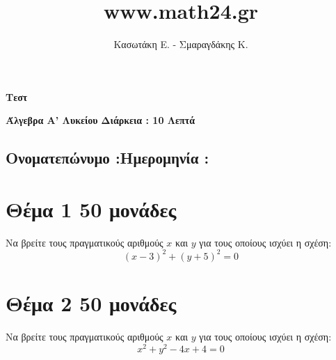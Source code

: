 \documentclass[a4paper,11pt]{report}
\author{Κασωτάκη Ε. - Σμαραγδάκης Κ.}
\title{www.math24.gr}
\begin{document}
\pagestyle{fancy}
\fancyhead{}
\fancyfoot{}
\renewcommand{\headrulewidth}{0pt}
\renewcommand{\footrulewidth}{0pt}


 
\begin{shaded}
\begin{center}
\huge \textbf{Τεστ}\\
\end{center} 
\textbf{Άλγεβρα Α' Λυκείου} \hfill \textbf{Διάρκεια : \hspace{2em} 10 Λεπτά}
\subsection*{Ονοματεπώνυμο :\hfill Ημερομηνία : \hspace{5em}}
\end{shaded}
\vspace{2em}

\section*{Θέμα 1 \hfill \small{50 μονάδες}}
Να βρείτε τους πραγματικούς αριθμούς $x$ και $y$ για τους οποίους ισχύει η σχέση: 
$$ (x-3)^{2} + (y+5)^{2} =  0  $$


\section*{Θέμα 2 \hfill \small{50 μονάδες}}
Να βρείτε τους πραγματικούς αριθμούς $x$ και $y$ για τους οποίους ισχύει η σχέση: 
$$ x^{2} + y^{2} -4x + 4 =  0  $$
\end{document}
